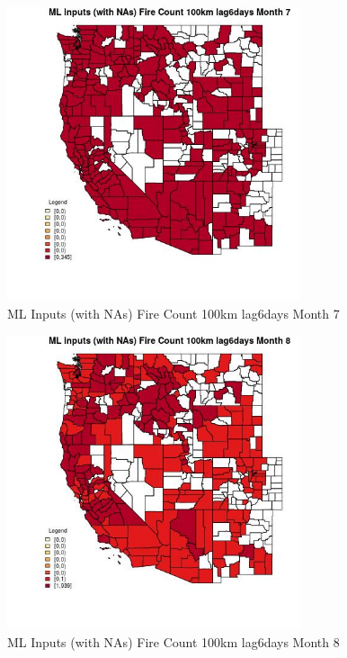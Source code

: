 \begin{figure} 
\centering  
\includegraphics[width=0.77\textwidth]{Code_Outputs/Report_ML_input_PM25_Step4_part_e_de_duplicated_aves_compiled_2019-05-21wNAs_CountyFire_Count_100km_lag6daysmedianMonth7.jpg} 
\caption{\label{fig:Report_ML_input_PM25_Step4_part_e_de_duplicated_aves_compiled_2019-05-21wNAsCountyFire_Count_100km_lag6daysmedianMonth7}ML Inputs (with NAs) Fire Count 100km lag6days Month 7} 
\end{figure} 
 

\begin{figure} 
\centering  
\includegraphics[width=0.77\textwidth]{Code_Outputs/Report_ML_input_PM25_Step4_part_e_de_duplicated_aves_compiled_2019-05-21wNAs_CountyFire_Count_100km_lag6daysmedianMonth8.jpg} 
\caption{\label{fig:Report_ML_input_PM25_Step4_part_e_de_duplicated_aves_compiled_2019-05-21wNAsCountyFire_Count_100km_lag6daysmedianMonth8}ML Inputs (with NAs) Fire Count 100km lag6days Month 8} 
\end{figure} 
 

